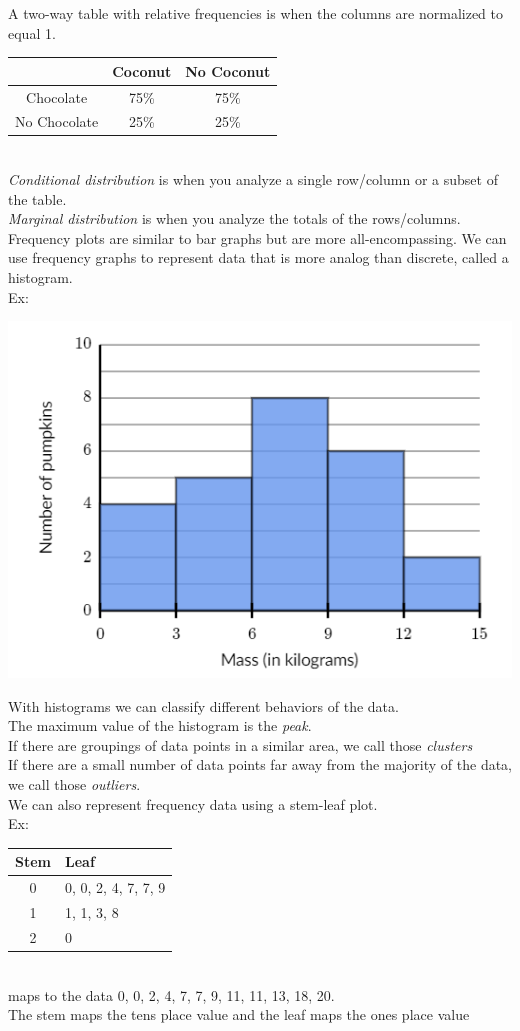 \documentclass[11pt, fleqn]{article}
\begin{document}
A two-way table with relative frequencies is when the columns are normalized to equal 1.\\
\begin{tabular}{c|c|c}
    & Coconut & No Coconut\\
    \hline
    Chocolate & 75\% & 75\%\\
    No Chocolate & 25\% & 25\%
\end{tabular}\\
\textit{Conditional distribution} is when you analyze a single row/column or a subset of the table.\\
\textit{Marginal distribution} is when you analyze the totals of the rows/columns.\\
Frequency plots are similar to bar graphs but are more all-encompassing. We can use frequency graphs to represent data that is more analog than discrete, called a histogram.\\
Ex:\\
\centerline{\includegraphics[scale=0.7]{FundamentalsPictures/histogram.png}}
With histograms we can classify different behaviors of the data.\\
The maximum value of the histogram is the \textit{peak}.\\
If there are groupings of data points in a similar area, we call those \textit{clusters}\\
If there are a small number of data points far away from the majority of the data, we call those \textit{outliers}.\\
We can also represent frequency data using a stem-leaf plot.\\
Ex:\\
\begin{tabular}{c|l}
    Stem & Leaf\\
    \hline
    0 & 0, 0, 2, 4, 7, 7, 9\\
    1 & 1, 1, 3, 8\\
    2 & 0
\end{tabular}\\
maps to the data 0, 0, 2, 4, 7, 7, 9, 11, 11, 13, 18, 20.\\
The stem maps the tens place value and the leaf maps the ones place value
\end{document}
